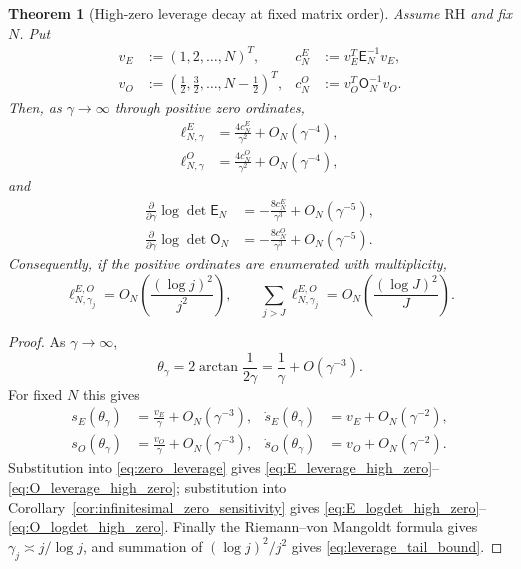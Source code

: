 \documentclass[preprint,12pt]{elsarticle}
\numberwithin{equation}{section}
\theoremstyle{plain}
\newtheorem{theorem}{Theorem}[section]
\theoremstyle{definition}
\theoremstyle{remark}
\newcommand{\RH}{\mathrm{RH}}
\newcommand{\E}{\mathsf E}
\newcommand{\Omat}{\mathsf O}
\begin{document}
\begin{theorem}[High-zero leverage decay at fixed matrix order]
\label{thm:high_zero_leverage_decay}
Assume $\RH$ and fix $N$.  Put
\begin{align}
v_E&:=(1,2,\ldots,N)^T,
&c_N^E&:=v_E^T\E_N^{-1}v_E,
\label{eq:cNE_definition}\\
v_O&:=(\tfrac12,\tfrac32,\ldots,N-\tfrac12)^T,
&c_N^O&:=v_O^T\Omat_N^{-1}v_O.
\label{eq:cNO_definition}
\end{align}
Then, as $\gamma\to\infty$ through positive zero ordinates,
\begin{align}
\ell_{N,\gamma}^E
&=\frac{4c_N^E}{\gamma^2}+O_N(\gamma^{-4}),
\label{eq:E_leverage_high_zero}\\
\ell_{N,\gamma}^O
&=\frac{4c_N^O}{\gamma^2}+O_N(\gamma^{-4}),
\label{eq:O_leverage_high_zero}
\end{align}
and
\begin{align}
\frac{\partial}{\partial\gamma}\log\det\E_N
&=-\frac{8c_N^E}{\gamma^3}+O_N(\gamma^{-5}),
\label{eq:E_logdet_high_zero}\\
\frac{\partial}{\partial\gamma}\log\det\Omat_N
&=-\frac{8c_N^O}{\gamma^3}+O_N(\gamma^{-5}).
\label{eq:O_logdet_high_zero}
\end{align}
Consequently, if the positive ordinates are enumerated with multiplicity,
\begin{equation}
\ell_{N,\gamma_j}^{E,O}
=O_N\left(\frac{(\log j)^2}{j^2}\right),
\qquad
\sum_{j>J}\ell_{N,\gamma_j}^{E,O}
=O_N\left(\frac{(\log J)^2}{J}\right).
\label{eq:leverage_tail_bound}
\end{equation}
\end{theorem}

\begin{proof}
As $\gamma\to\infty$,
\begin{equation}
\theta_\gamma
=2\arctan\frac1{2\gamma}
=\frac1\gamma+O(\gamma^{-3}).
\end{equation}
For fixed $N$ this gives
\begin{align}
s_E(\theta_\gamma)&=\frac{v_E}{\gamma}+O_N(\gamma^{-3}),
&\dot s_E(\theta_\gamma)&=v_E+O_N(\gamma^{-2}),\\
s_O(\theta_\gamma)&=\frac{v_O}{\gamma}+O_N(\gamma^{-3}),
&\dot s_O(\theta_\gamma)&=v_O+O_N(\gamma^{-2}).
\end{align}
Substitution into \eqref{eq:zero_leverage} gives \eqref{eq:E_leverage_high_zero}--\eqref{eq:O_leverage_high_zero}; substitution into Corollary~\ref{cor:infinitesimal_zero_sensitivity} gives \eqref{eq:E_logdet_high_zero}--\eqref{eq:O_logdet_high_zero}.  Finally the Riemann--von Mangoldt formula gives $\gamma_j\asymp j/\log j$, and summation of $(\log j)^2/j^2$ gives \eqref{eq:leverage_tail_bound}.
\end{proof}
\end{document}
